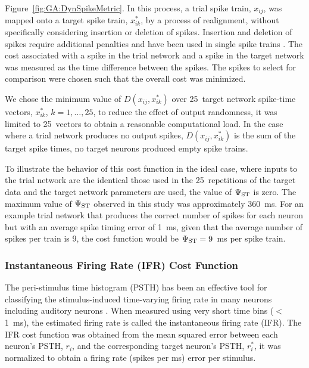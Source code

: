 Figure~\ref{fig:GA:DynSpikeMetric}.  In this process, a trial spike
train, $x_{ij}$, was mapped onto a target spike train, $x_{ik}^{*}$,
by a process of realignment, without specifically considering
insertion or deletion of spikes. Insertion and deletion of spikes
require additional penalties and have been used in single spike trains
\citep{VictorGoldbergEtAl:2007,Aronov:2003}.  The cost associated with
a spike in the trial network and a spike in the target network was
measured as the time difference between the spikes. The spikes to
select for comparison were chosen such that the overall cost was
minimized.

\smallskip{}

We chose the minimum value of $D(x_{ij} ,x_{ik}^{*} )$ over 25~target
network spike-time vectors, $x_{ik}^{*}$, $k=1,\dots,25$, to reduce
the effect of output randomness, it was limited to 25~vectors to
obtain a reasonable computational load.  In the case where a trial
network produces no output spikes, $D(x_{ij} ,x_{ik}^{*})$ is the sum
of the target spike times, no target neurons produced empty spike
trains.

\smallskip{}

To illustrate the behavior of this cost function in the ideal case,
where {\ANF} inputs to the trial network are the identical those used in
the 25~repetitions of the target data and the target network
parameters are used, the value of $\Psi_{{\rm ST}}$ is zero. The
maximum value of $\Psi_{{\rm ST}}$ observed in this study was
approximately 360~ms.  For an example trial network that produces the
correct number of spikes for each neuron but with an average spike
timing error of 1~ms, given that the average number of spikes per
train is 9, the cost function would be $\Psi_{{\rm ST}}=9$~ms per
spike train.



\subsubsection{Instantaneous Firing Rate (IFR) Cost Function}\label{sec:GA:inst-firing-rate-cost-fn}


The peri-stimulus time histogram (PSTH) has been an effective tool for
classifying the stimulus-induced time-varying firing rate in many
neurons including auditory neurons
\citep{BlackburnSachs:1989,SmithRhode:1989}.  When measured using very
short time bins ($<$1~ms), the estimated firing rate is called the
instantaneous firing rate (IFR).  The IFR cost function was obtained
from the mean squared error between each neuron's PSTH, $r_{i} $, and
the corresponding target neuron's PSTH, $r_{i}^{*} $, it was
normalized to obtain a firing rate (spikes per ms) error per stimulus.

